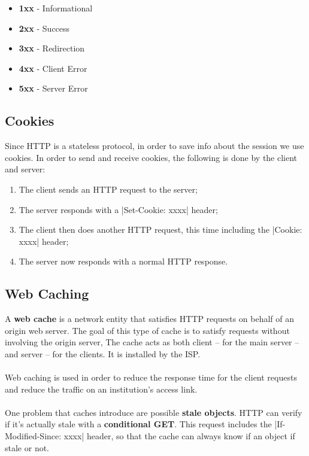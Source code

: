 \documentclass{article}
\begin{document}
\begin{itemize}
	\item \textbf{1xx} - Informational
	\item \textbf{2xx} - Success
	\item \textbf{3xx} - Redirection
	\item \textbf{4xx} - Client Error
	\item \textbf{5xx} - Server Error
\end{itemize}

\subsection{Cookies}
Since HTTP is a stateless protocol, in order to save info about the session we use cookies. In order to send and receive cookies, the following is done by the client and server:

\begin{enumerate}
	\item The client sends an HTTP request to the server;
	\item The server responds with a \cverb|Set-Cookie: xxxx| header;
	\item The client then does another HTTP request, this time including the \cverb|Cookie: xxxx| header;
	\item The server now responds with a normal HTTP response.
\end{enumerate}

\subsection{Web Caching}
A \textbf{web cache} is a network entity that satisfies HTTP requests on behalf of an origin web server. The goal of this type of cache is to satisfy requests without involving the origin server, The cache acts as both client -- for the main server -- and server -- for the clients. It is installed by the ISP. \\ \\
Web caching is used in order to reduce the response time for the client requests and reduce the traffic on an institution's access link. \\ \\
One problem that caches introduce are possible \textbf{stale objects}. HTTP can verify if it's actually stale with a \textbf{conditional GET}. This request includes the \cverb|If-Modified-Since: xxxx| header, so that the cache can always know if an object if stale or not.
\end{document}
